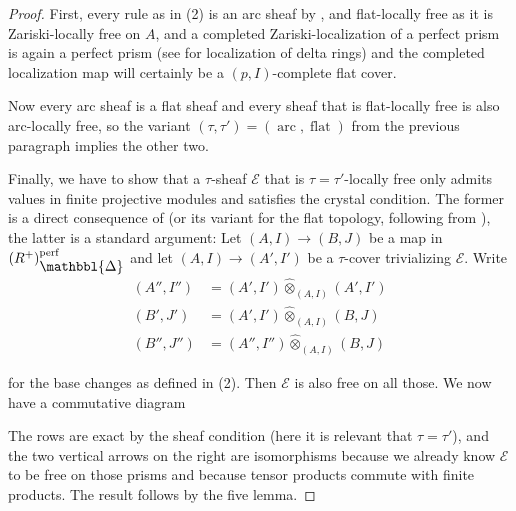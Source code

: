 \documentclass[10pt,twoside]{article}
\numberwithin{equation}{section}
\theoremstyle{plain}
\theoremstyle{definition}
\newcommand{\MCE}{\mathcal{E}}
\DeclareMathOperator{\perf}{perf}
\DeclareMathOperator{\arc}{arc}
\newcommand{\Prism}{{\mathlarger{\mathbbl{\Delta}}}}
\DeclareMathOperator{\Flat}{flat}
\begin{document}
\begin{proof}
    First, every rule as in (2) is an arc sheaf by , and flat-locally free as it is Zariski-locally free on \(A\), and a completed Zariski-localization of a perfect prism is again a perfect prism (see \cite[Remark 2.16]{BS21} for localization of delta rings) and the completed localization map will certainly be a \((p,I)\)-complete flat cover.\par
    Now every arc sheaf is a flat sheaf and every sheaf that is flat-locally free is also arc-locally free, so the variant \((\tau,\tau')=(\arc,\Flat)\) from the previous paragraph implies the other two.\par
    Finally, we have to show that a \(\tau\)-sheaf \(\MCE\) that is \(\tau=\tau'\)-locally free only admits values in finite projective modules and satisfies the crystal condition. The former is a direct consequence of  (or its variant for the flat topology, following from ), the latter is a standard argument: Let \((A,I)\to (B,J)\) be a map in \((R^+)_{\Prism}^{\perf}\) and let \((A,I)\to( A', I')\) be a \(\tau\)-cover trivializing \(\MCE\). Write
\begin{align*}
(A'',I'')&=( A', I')\hat\otimes_{(A,I)}( A', I')\\
( B', J')&=( A', I')\hat\otimes_{(A,I)}(B,J)\\
( B'',J'')&=(A'',I'')\hat\otimes_{(A,I)}(B,J)
\end{align*}

for the base changes as defined in  (2). Then \(\MCE\) is also free on all those. We now have a commutative diagram

\begin{center}
\end{center}

The rows are exact by the sheaf condition (here it is relevant that \(\tau=\tau'\)), and the two vertical arrows on the right are isomorphisms because we already know \(\MCE\) to be free on those prisms and because tensor products commute with finite products. The result follows by the five lemma. 
\end{proof}
\end{document}

